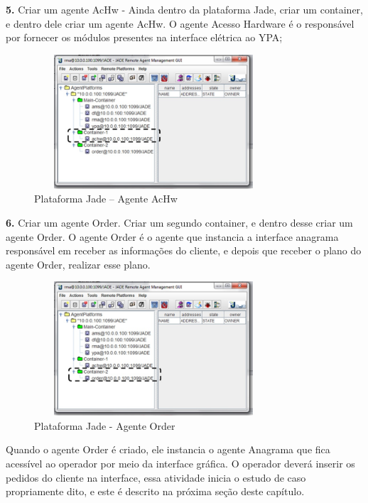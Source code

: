\documentclass[10pt,letterpaper,twocolumn]{IEEEtran}
\begin{document}
\textbf{5.} Criar um agente AcHw -
Ainda dentro da plataforma Jade, criar um container, e dentro dele criar um agente AcHw. O agente Acesso Hardware é o responsável por fornecer os módulos presentes na interface elétrica ao YPA; 

\begin{figure}[!h]
	\centering
	\includegraphics[width=8.9cm, height=5cm]{MeDSE_imagens/F110_SIAPE_AcHw.jpg} 
	\caption{Plataforma Jade -- Agente AcHw}
	\label{F110}
\end{figure}

\textbf{6.} Criar um agente Order.
Criar um segundo container, e dentro desse criar um agente Order. O agente Order é o agente que instancia a interface anagrama responsável em receber as informações do cliente, e depois que receber o plano do agente Order, realizar esse plano.

\begin{figure}[!h]
	\centering
	\includegraphics[width=8.9cm, height=5cm]{MeDSE_imagens/F111_SIAPE_ORDER.jpg} 
	\caption{Plataforma Jade - Agente Order}
	\label{F111}
\end{figure}

Quando o agente Order é criado, ele instancia o agente Anagrama que fica acessível ao operador por meio da interface gráfica. O operador deverá inserir os pedidos do cliente na interface, essa atividade inicia o estudo de caso propriamente dito, e este é descrito na próxima seção deste capítulo.
\end{document}
